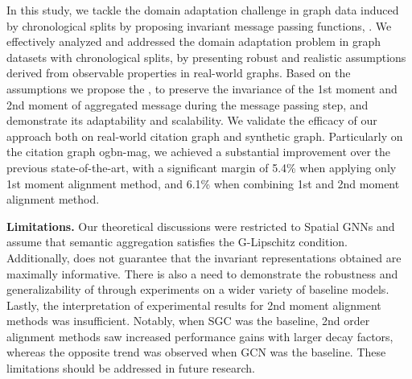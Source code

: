 In this study, we tackle the domain adaptation challenge in graph data induced by chronological splits by proposing invariant message passing functions, \IMPaCT. We effectively analyzed and addressed the domain adaptation problem in graph datasets with chronological splits, by presenting robust and realistic assumptions derived from observable properties in real-world graphs. Based on the assumptions we propose the \IMPaCT, to preserve the invariance of the 1st moment and 2nd moment of aggregated message during the message passing step, and demonstrate its adaptability and scalability. We validate the efficacy of our approach both on real-world citation graph and synthetic graph. Particularly on the citation graph ogbn-mag, we achieved a substantial improvement over the previous state-of-the-art, with a significant margin of 5.4\% when applying only 1st moment alignment method, and 6.1\% when combining 1st and 2nd moment alignment method.

\textbf{Limitations.} Our theoretical discussions were restricted to Spatial GNNs and assume that semantic aggregation satisfies the G-Lipschitz condition. Additionally, \IMPaCT does not guarantee that the invariant representations obtained are maximally informative. There is also a need to demonstrate the robustness and generalizability of \IMPaCT through experiments on a wider variety of baseline models. Lastly, the interpretation of experimental results for 2nd moment alignment methods was insufficient. Notably, when SGC was the baseline, 2nd order alignment methods saw increased performance gains with larger decay factors, whereas the opposite trend was observed when GCN was the baseline. These limitations should be addressed in future research.



